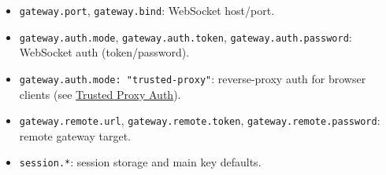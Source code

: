 \begin{itemize}
  \item \texttt{gateway.port}, \texttt{gateway.bind}: WebSocket host/port.
  \item \texttt{gateway.auth.mode}, \texttt{gateway.auth.token}, \texttt{gateway.auth.password}: WebSocket auth (token/password).
  \item \texttt{gateway.auth.mode: "trusted-proxy"}: reverse-proxy auth for browser clients (see \href{/gateway/trusted-proxy-auth}{Trusted Proxy Auth}).
  \item \texttt{gateway.remote.url}, \texttt{gateway.remote.token}, \texttt{gateway.remote.password}: remote gateway target.
  \item \texttt{session.*}: session storage and main key defaults.
\end{itemize}



\clearpage
